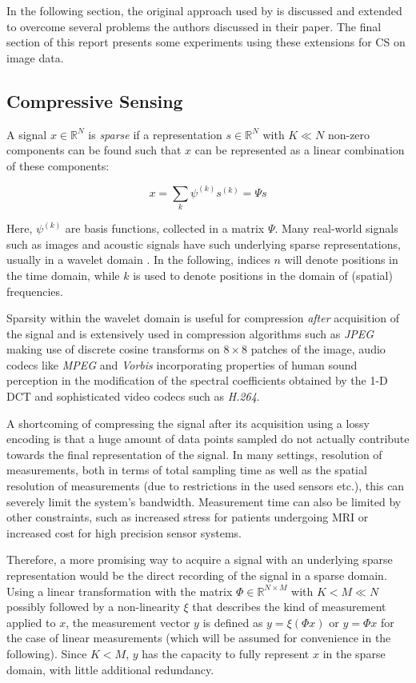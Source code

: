 \documentclass[10pt,twocolumn,a4paper]{article}
\newcommand{\IR}{\mathds{R}}
\newcommand{\basis}{\psi}
\newcommand{\Basis}{\Psi}
\newcommand{\Measure}{\Phi}
\begin{document}
In the following section, the original approach used by \cite{Mousavi2015} is discussed and extended to overcome several problems the authors discussed in their paper.
The final section of this report presents some experiments using these extensions for CS on image data.

\subsection{Compressive Sensing}

A signal $x \in \IR^N$ is \emph{sparse} if a representation $s \in \IR^N$ with $K \ll N$ non-zero components can be found such that $x$ can be represented as a linear combination of these components:

\begin{equation}
    x = \sum_{k} \basis^{(k)} s^{(k)} = \Basis s
\end{equation}

Here, $\basis^{(k)}$ are basis functions, collected in a matrix $\Basis$.
Many real-world signals such as images and acoustic signals have such underlying sparse representations, usually in a wavelet domain \cite{Donoho2006}.
In the following, indices $n$ will denote positions in the time domain, while $k$ is used to denote positions in the domain of (spatial) frequencies.

Sparsity within the wavelet domain is useful for compression \emph{after} acquisition of the signal and is extensively used in compression algorithms such as \emph{JPEG} making use of discrete cosine transforms on $8 \times 8$ patches of the image, audio codecs like 
\emph{MPEG} and \emph{Vorbis} incorporating properties of human sound perception in the modification of the spectral coefficients obtained by the 1-D DCT and sophisticated video codecs such as \emph{H.264}.

A shortcoming of compressing the signal after its acquisition using a lossy encoding is that a huge amount of data points sampled do not actually contribute towards the final representation of the signal.
In many settings, resolution of measurements, both in terms of total sampling time as well as the spatial resolution of measurements (due to restrictions in the used sensors etc.), this can severely limit the system's bandwidth.
Measurement time can also be limited by other constraints, such as increased stress for patients undergoing MRI or increased cost for high precision sensor systems.

Therefore, a more promising way to acquire a signal with an underlying sparse representation would be the direct recording of the signal in a sparse domain.
Using a linear transformation with the matrix $\Measure \in \IR^{N \times M}$ with $K < M \ll N$ possibly followed by a non-linearity $\xi$ that describes the kind of measurement applied to $x$, the measurement vector $y$ is defined as $y = \mathds \xi(\Measure x)$ or $y = \Measure x$ for the case of linear measurements (which will be assumed for convenience in the following).
Since $K < M$, $y$ has the capacity to fully represent $x$ in the sparse domain, with little additional redundancy.
\end{document}
